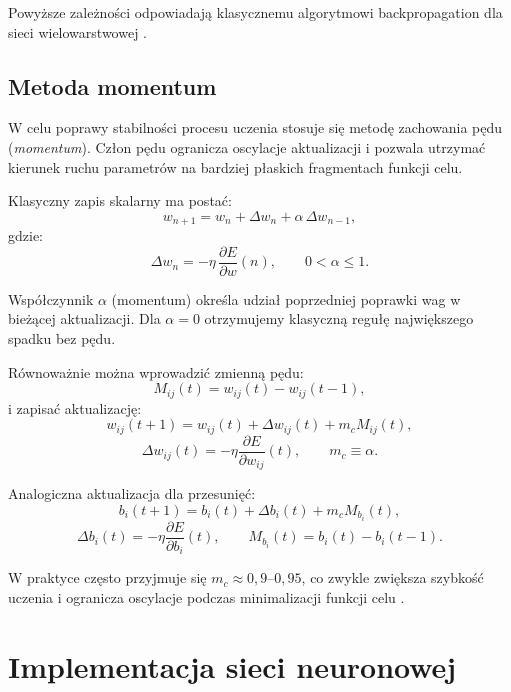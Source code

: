 \documentclass[12pt,twoside]{article}
\begin{document}
Powyższe zależności odpowiadają klasycznemu algorytmowi backpropagation dla sieci wielowarstwowej \cite{zajdelLab9}.
\subsection{Metoda momentum}

W celu poprawy stabilności procesu uczenia stosuje się metodę zachowania pędu (\textit{momentum}).
Człon pędu ogranicza oscylacje aktualizacji i pozwala utrzymać kierunek ruchu parametrów na bardziej płaskich fragmentach funkcji celu.

Klasyczny zapis skalarny ma postać:
\begin{equation}
w_{n+1}=w_n+\Delta w_n+\alpha\,\Delta w_{n-1},
\end{equation}
gdzie:
\begin{equation}
\Delta w_n=-\eta\,\frac{\partial E}{\partial w}(n),
\qquad
0<\alpha\leq 1.
\end{equation}

Współczynnik $\alpha$ (momentum) określa udział poprzedniej poprawki wag w bieżącej aktualizacji.
Dla $\alpha=0$ otrzymujemy klasyczną regułę największego spadku bez pędu.

Równoważnie można wprowadzić zmienną pędu:
\begin{equation}
M_{ij}(t)=w_{ij}(t)-w_{ij}(t-1),
\end{equation}
i zapisać aktualizację:
\begin{equation}
w_{ij}(t+1)=w_{ij}(t)+\Delta w_{ij}(t)+m_c M_{ij}(t),
\end{equation}
\begin{equation}
\Delta w_{ij}(t)=-\eta\frac{\partial E}{\partial w_{ij}}(t),
\qquad
m_c\equiv\alpha.
\end{equation}

Analogiczna aktualizacja dla przesunięć:
\begin{equation}
b_i(t+1)=b_i(t)+\Delta b_i(t)+m_c M_{b_i}(t),
\end{equation}
\begin{equation}
\Delta b_i(t)=-\eta\frac{\partial E}{\partial b_i}(t),
\qquad
M_{b_i}(t)=b_i(t)-b_i(t-1).
\end{equation}


W praktyce często przyjmuje się $m_c\approx 0{,}9$--$0{,}95$, co zwykle zwiększa szybkość uczenia i ogranicza oscylacje podczas minimalizacji funkcji celu \cite{zajdelLabm}.

\section{Implementacja sieci neuronowej}
\end{document}
